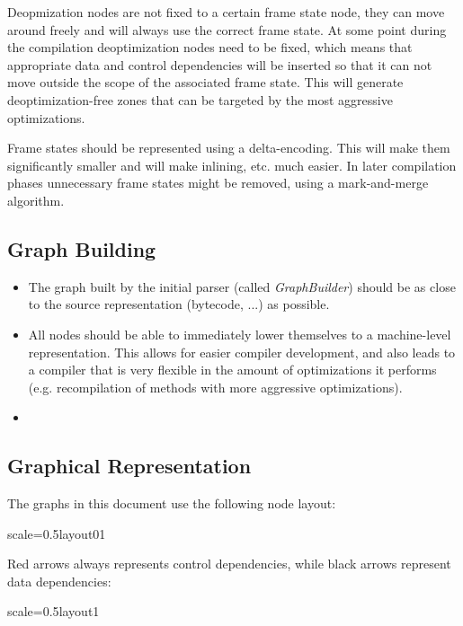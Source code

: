 \documentclass[twocolumn]{svjour3}
\begin{document}
Deopmization nodes are not fixed to a certain frame state node, they can move around freely and will always use the correct frame state.
At some point during the compilation deoptimization nodes need to be fixed, which means that appropriate data and control dependencies will be inserted so that it can not move outside the scope of the associated frame state.
This will generate deoptimization-free zones that can be targeted by the most aggressive optimizations.

Frame states should be represented using a delta-encoding.
This will make them significantly smaller and will make inlining, etc. much easier.
In later compilation phases unnecessary frame states might be removed, using a mark-and-merge algorithm.



\subsection{Graph Building}
\begin{itemize}
    \item The graph built by the initial parser (called \emph{GraphBuilder}) should be as close to the source representation (bytecode, ...) as possible.
    \item All nodes should be able to immediately lower themselves to a machine-level representation. This allows for easier compiler development, and also leads to a compiler that is very flexible in the amount of optimizations it performs (e.g. recompilation of methods with more aggressive optimizations).
    \item 
\end{itemize}

\subsection{Graphical Representation}
The graphs in this document use the following node layout:

\begin{digraphenv}{scale=0.5}{layout01}
\end{digraphenv}

Red arrows always represents control dependencies, while black arrows represent data dependencies:

\begin{digraphenv}{scale=0.5}{layout1}
\end{digraphenv}
\end{document}
